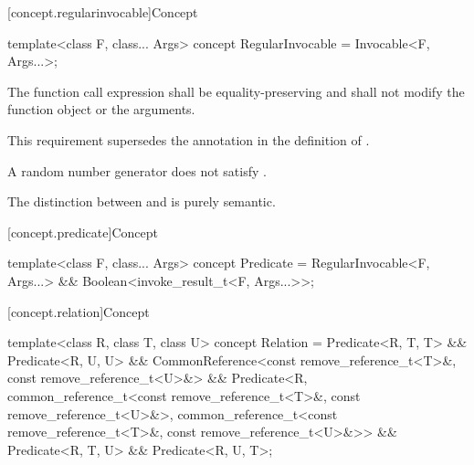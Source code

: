 [concept.regularinvocable]{Concept }

%
\begin{itemdecl}
template<class F, class... Args>
  concept RegularInvocable = Invocable<F, Args...>;
\end{itemdecl}

\begin{itemdescr}
\pnum
The  function call expression shall be equality-preserving and
shall not modify the function object or the
arguments.
\begin{note}
This requirement supersedes the annotation in the definition of
.
\end{note}

\pnum
\begin{example}
A random number generator does not satisfy
.
\end{example}

\pnum
\begin{note}
The distinction between  and 
is purely semantic.
\end{note}
\end{itemdescr}

[concept.predicate]{Concept }

%
\begin{itemdecl}
template<class F, class... Args>
  concept Predicate = RegularInvocable<F, Args...> && Boolean<invoke_result_t<F, Args...>>;
\end{itemdecl}

[concept.relation]{Concept }

%
\begin{itemdecl}
template<class R, class T, class U>
  concept Relation =
    Predicate<R, T, T> && Predicate<R, U, U> &&
    CommonReference<const remove_reference_t<T>&, const remove_reference_t<U>&> &&
    Predicate<R,
      common_reference_t<const remove_reference_t<T>&, const remove_reference_t<U>&>,
      common_reference_t<const remove_reference_t<T>&, const remove_reference_t<U>&>> &&
    Predicate<R, T, U> && Predicate<R, U, T>;
\end{itemdecl}

